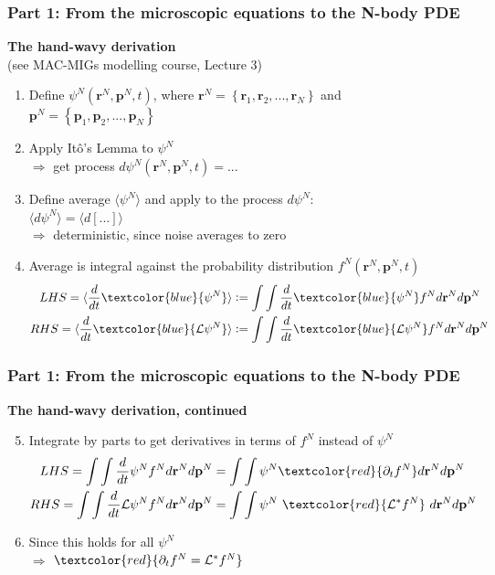 \documentclass[aspectratio=169,xcolor=dvipsnames]{beamer}
\begin{document}
\begin{frame}
	\frametitle{Part 1: From the microscopic equations to the N-body PDE}
	\textbf{The hand-wavy derivation} \\(see MAC-MIGs modelling course, Lecture 3)
	\vspace{0.2cm}
	\begin{enumerate}
		\item Define $\psi^N(\mathbf{r}^N, \mathbf{p}^N, t)$, where $\mathbf{r}^N = \left\{\mathbf{r}_1, \mathbf{r}_2,..., \mathbf{r}_N\right\}$ and $\mathbf{p}^N = \left\{\mathbf{p}_1, \mathbf{p}_2,..., \mathbf{p}_N\right\}$
		\item Apply It\^{o}'s Lemma to $\psi^N$\\
		$\Rightarrow$ get process $ d\psi^N(\mathbf{r}^N, \mathbf{p}^N, t) = ...$
		\item Define average $\langle \psi^N\rangle$ and apply to the process $ d \psi^N$:\\ $ \langle d \psi^N \rangle = \langle d [...] \rangle$\\
		$\Rightarrow$ deterministic, since noise averages to zero
		\item Average is integral against the probability distribution $f^N(\mathbf{r}^N, \mathbf{p}^N, t)$
		\begin{align*}
		 LHS = \langle \frac{d}{dt} \textcolor{blue}{\psi^N} \rangle &:= \int \int\frac{d}{dt} \textcolor{blue}{\psi^N} f^N d\mathbf{r}^N d\mathbf{p}^N\\
		 RHS = \langle \frac{d}{dt} \textcolor{blue}{\mathcal{L} \psi^N}\rangle &:= \int \int\frac{d}{dt}\textcolor{blue}{\mathcal{L} \psi^N} f^N d\mathbf{r}^N d\mathbf{p}^N
		\end{align*}
	\end{enumerate}

\end{frame}
\begin{frame}
	\frametitle{Part 1: From the microscopic equations to the N-body PDE}
	\textbf{The hand-wavy derivation, continued}
		\vspace{0.2cm}
	\begin{enumerate}
		\setcounter{enumi}{4}
		\item Integrate by parts to get derivatives in terms of $f^N$ instead of $\psi^N$
		\begin{align*}
		LHS = \int \int\frac{d}{dt} \psi^N f^N d\mathbf{r}^N d\mathbf{p}^N &= \int \int \psi^N \textcolor{red}{\partial_t f^N} d\mathbf{r}^N d\mathbf{p}^N \\
		RHS = \int \int\frac{d}{dt}\mathcal{L} \psi^N f^N d\mathbf{r}^N d\mathbf{p}^N &= \int \int \psi^N \ \textcolor{red}{\mathcal{L}^* f^N}\ d\mathbf{r}^N d\mathbf{p}^N
		\end{align*}
		\item Since this holds for all $\psi^N$\\
			\vspace{0.2cm}
		$\Rightarrow$  $\textcolor{red}{\partial_t f^N = \mathcal{L}^* f^N}$
	\end{enumerate}
	
\end{frame}
\end{document}
